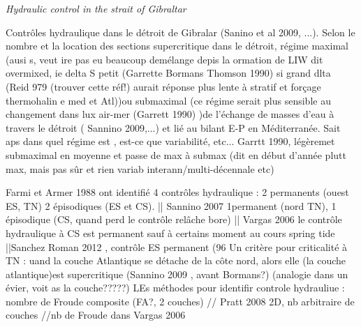 









\textit{Hydraulic control in the strait of Gibraltar}

Contrôles hydraulique dans le détroit de Gibralar (Sanino et al 2009, ...). Selon le nombre et la location des sections supercritique dans le détroit, régime maximal (ausi s, veut ire pas eu beaucoup demélange depis la ormation de LIW dit overmixed, ie delta S petit (Garrette Bormans Thomson 1990) si grand dlta (Reid 979 (trouver cette réf!) aurait réponse plus lente à stratif et forçage thermohalin e med et Atl))ou submaximal (ce régime serait plus sensible au changement dans lux air-mer (Garrett 1990) )de l'échange de masses d'eau à travers le détroit ( Sannino 2009,...) et lié au bilant E-P en Méditerranée. Sait aps dans quel régime est , est-ce que variabilité, etc... Garrtt 1990, légèremet submaximal en moyenne et passe de max à submax (dit en début d'année plutt max, mais pas sûr et rien variab interann/multi-décennale etc)

Farmi et Armer 1988 ont identifié 4 contrôles hydraulique : 2 permanents (ouest ES, TN) 2 épisodiques (ES et CS). || Sannino 2007 1permanent (nord TN), 1 épisodique (CS, quand perd le contrôle relâche bore) || Vargas 2006 le contrôle hydraulique à CS est permanent sauf à certains moment au cours spring tide ||Sanchez Roman 2012 , contrôle ES permanent (96%
Un critère pour criticalité à TN : uand la couche Atlantique se détache de la côte nord, alors elle (la couche atlantique)est supercritique (Sannino 2009 , avant Bormans?) (analogie dans un évier, voit as la couche?????)
LEs méthodes pour identifir controle hydrauliue : nombre de Froude composite (FA?, 2 couches) // Pratt 2008 2D, nb arbitraire de couches //nb de Froude dans Vargas 2006




